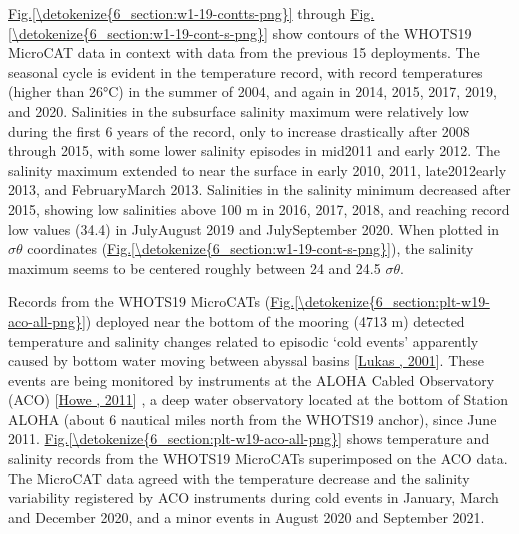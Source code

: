 \documentclass[a4paper,10pt,english,openany,oneside]{sphinxmanual}
\begin{document}
\sphinxAtStartPar
\hyperref[\detokenize{6_section:w1-19-contts-png}]{Fig.\@ \ref{\detokenize{6_section:w1-19-contts-png}}} through \hyperref[\detokenize{6_section:w1-19-cont-s-png}]{Fig.\@ \ref{\detokenize{6_section:w1-19-cont-s-png}}} show contours of
the WHOTS\sphinxhyphen{}19 MicroCAT data in context with data from the previous 15
deployments. The seasonal cycle is evident in the temperature record, with
record temperatures (higher than 26°C) in the summer of 2004, and again in
2014, 2015, 2017, 2019, and 2020. Salinities in the subsurface salinity maximum
were relatively low during the first 6 years of the record, only to increase
drastically after 2008 through 2015, with some lower salinity episodes in
mid\sphinxhyphen{}2011 and early 2012. The salinity maximum extended to near the surface in
early 2010, 2011, late2012\sphinxhyphen{}early 2013, and February\sphinxhyphen{}March 2013. Salinities in
the salinity minimum decreased after 2015, showing low salinities above 100 m
in 2016, 2017, 2018, and reaching record low values (34.4) in July\sphinxhyphen{}August 2019
and July\sphinxhyphen{}September 2020. When plotted in \(\sigma\theta\) coordinates
(\hyperref[\detokenize{6_section:w1-19-cont-s-png}]{Fig.\@ \ref{\detokenize{6_section:w1-19-cont-s-png}}}), the salinity maximum seems to be centered roughly
between 24 and 24.5 \(\sigma\theta\).

\sphinxAtStartPar
Records from the WHOTS\sphinxhyphen{}19 MicroCATs (\hyperref[\detokenize{6_section:plt-w19-aco-all-png}]{Fig.\@ \ref{\detokenize{6_section:plt-w19-aco-all-png}}}) deployed
near the bottom of the mooring (4713 m) detected temperature and salinity
changes related to episodic ‘cold events’ apparently caused by bottom water
moving between abyssal basins {[}\hyperlink{cite.references:id12}{Lukas , 2001}{]}. These events are being
monitored by instruments at the ALOHA Cabled Observatory (ACO) {[}\hyperlink{cite.references:id10}{Howe , 2011}{]}
, a deep water observatory located at the bottom of Station ALOHA (about 6
nautical miles north from the WHOTS\sphinxhyphen{}19 anchor), since June 2011.
\hyperref[\detokenize{6_section:plt-w19-aco-all-png}]{Fig.\@ \ref{\detokenize{6_section:plt-w19-aco-all-png}}} shows temperature and salinity records from
the WHOTS\sphinxhyphen{}19 MicroCATs superimposed on the ACO data. The MicroCAT data
agreed with the temperature decrease and the salinity variability
registered by ACO instruments during cold events in January, March and
December 2020, and a minor events in August 2020 and September 2021.
\end{document}
